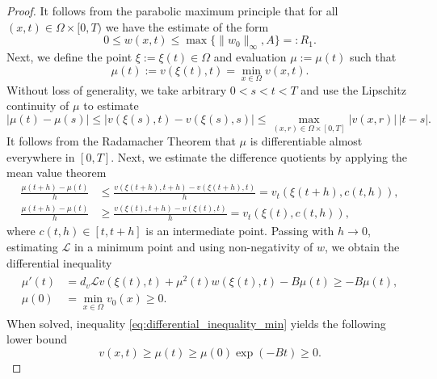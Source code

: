 \documentclass[preprint,12pt]{elsarticle}
\theoremstyle{plain}
\theoremstyle{definition}
\theoremstyle{remark}
\begin{document}
\begin{proof}
    It follows from the parabolic maximum principle that for all $(x, t) \in \Omega \times [0, T)$ we have the estimate of the form
    \begin{equation}
        \label{EQ:AprioriEstimate_V}
        0 \leq w(x, t) \leq \max\{\|w_0\|_\infty, A\} =: R_1.
    \end{equation}
    Next, we define the point $\xi := \xi(t) \in \Omega$ and evaluation $\mu := \mu(t)$ such that 
    \begin{equation*}
        \mu(t) := v(\xi(t), t) = \min_{x \in \Omega} v(x, t).
    \end{equation*}
    Without loss of generality, we take arbitrary $0 < s < t < T$ and use the 
    Lipschitz continuity of $\mu$ to estimate
    \begin{equation*}
        \left|\mu(t) - \mu(s)\right| \leq \left|v(\xi(s), t) - v(\xi(s), s)\right| \leq \max_{(x, r) \in \Omega \times [0, T]} |v(x, r)|\, |t-s|.
    \end{equation*}
    It follows from the Radamacher Theorem \cite[Theorem 3.2]{EvansGariepy2015} that $\mu$ is differentiable almost everywhere in $[0, T]$. Next, we estimate the difference quotients by applying the mean value theorem
    \begin{align*}
        \frac{\mu(t+h) - \mu(t)}{h} &\leq \frac{v(\xi(t+h), t+h) - v(\xi(t + h), t)}{h} = v_t(\xi(t + h), c(t, h)), \\
        \frac{\mu(t+h) - \mu(t)}{h} &\geq \frac{v(\xi(t), t+h) - v(\xi(t), t)}{h} = v_t(\xi(t), c(t, h)),
    \end{align*}
    where $c(t,h) \in [t, t+h]$ is an intermediate point. Passing with $h \rightarrow 0$, estimating $\mathcal{L}$ in a minimum point and using non-negativity of $w$, we obtain the differential inequality
    \begin{align}
        \label{eq:differential_inequality_min}
        \begin{split}
            \mu'(t) &= d_v \mathcal{L} v(\xi(t), t) + \mu^2(t) w(\xi(t), t) - B \mu(t) \geq - B \mu(t), \\
            \mu(0) &= \min_{x \in \Omega} v_0(x) \geq 0.
        \end{split}
    \end{align}
    When solved, inequality \eqref{eq:differential_inequality_min} yields the following lower bound 
    \begin{equation*}
        v(x,t) \geq \mu(t) \geq \mu(0) \exp(-B t) \geq 0.
    \end{equation*}

\end{proof}
\end{document}
